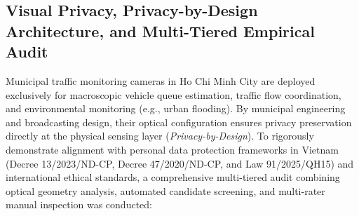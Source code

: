 \documentclass[preprint,12pt]{elsarticle}
\begin{document}
\subsection{Visual Privacy, Privacy-by-Design Architecture, and Multi-Tiered Empirical Audit}
Municipal traffic monitoring cameras in Ho Chi Minh City are deployed exclusively for macroscopic vehicle queue estimation, traffic flow coordination, and environmental monitoring (e.g., urban flooding). By municipal engineering and broadcasting design, their optical configuration ensures privacy preservation directly at the physical sensing layer (\textit{Privacy-by-Design}). To rigorously demonstrate alignment with personal data protection frameworks in Vietnam (Decree 13/2023/ND-CP, Decree 47/2020/ND-CP, and Law 91/2025/QH15) and international ethical standards, a comprehensive multi-tiered audit combining optical geometry analysis, automated candidate screening, and multi-rater manual inspection was conducted:
\end{document}
